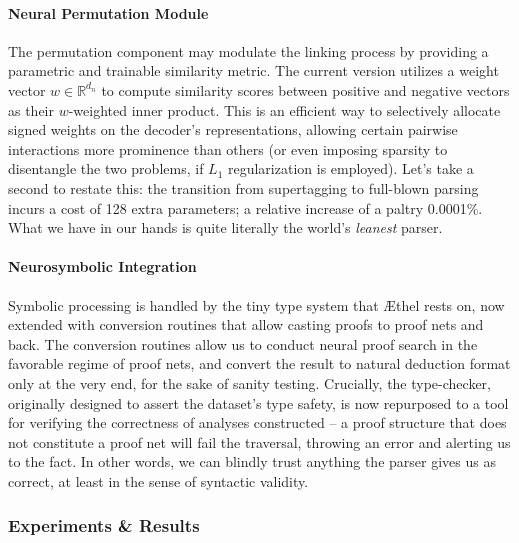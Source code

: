 \paragraph{Neural Permutation Module}
The permutation component may modulate the linking process by providing a parametric and trainable similarity metric.
The current version utilizes a weight vector $w \in \mathbb{R}^{d_n}$ to compute similarity scores between positive and negative vectors as their $w$-weighted inner product.
This is an efficient way to selectively allocate signed weights on the decoder's representations, allowing certain pairwise interactions more prominence than others (or even imposing sparsity to disentangle the two problems, if $L_1$ regularization is employed).
Let's take a second to restate this: the transition from supertagging to full-blown parsing incurs a cost of 128 extra parameters; a relative increase of a paltry 0.0001\%.
What we have in our hands is quite literally the world's \textit{leanest} parser.

\paragraph{Neurosymbolic Integration}
Symbolic processing is handled by the tiny type system that \AE thel rests on, now extended with conversion routines that allow casting proofs to proof nets and back.
The conversion routines allow us to conduct neural proof search in the favorable regime of proof nets, and convert the result to natural deduction format only at the very end, for the sake of sanity testing.
Crucially, the type-checker, originally designed to assert the dataset's type safety, is now repurposed to a tool for verifying the correctness of analyses constructed -- a proof structure that does not constitute a proof net will fail the traversal, throwing an error and alerting us to the fact.
In other words, we can blindly trust anything the parser gives us as correct, at least in the sense of syntactic validity.

\subsubsection{Experiments \& Results}
